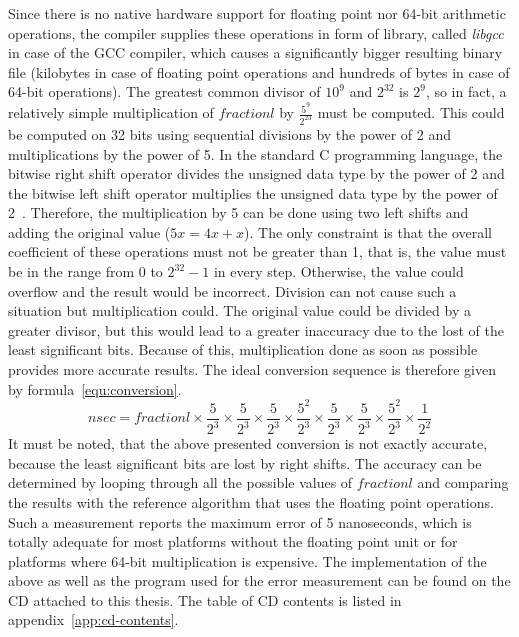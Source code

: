 Since there is no native hardware support for floating point nor 64-bit arithmetic operations,
the compiler supplies these operations in form of library, called {\it{libgcc}} in case of the GCC compiler,
which causes a significantly bigger resulting binary file
(kilobytes in case of floating point operations and hundreds of bytes in case of 64-bit operations).
The greatest common divisor of $10^9$ and $2^{32}$ is $2^9$,
so in fact, a relatively simple multiplication of $fractionl$ by $\frac{5^9}{2^{23}}$ must be computed.
This could be computed on 32 bits using sequential
divisions by the power of 2 and multiplications by the power of 5.
In the standard C programming language, the bitwise right shift operator divides the unsigned data type by the power of 2
and the bitwise left shift operator multiplies the unsigned data type by the power of 2~\cite{c99}.
Therefore, the multiplication by 5 can be done using two left shifts and
adding the original value ($5x = 4x + x$).
The only constraint is that the overall coefficient of these operations must not be greater than 1,
that is, the value must be in the range from $0$ to $2^{32}-1$ in every step.
Otherwise, the value could overflow and the result would be incorrect.
Division can not cause such a situation but multiplication could.
The original value could be divided by a greater divisor,
but this would lead to a greater inaccuracy due to the lost of the least significant bits.
Because of this, multiplication done as soon as possible provides more accurate results.
The ideal conversion sequence is therefore given by formula~\ref{equ:conversion}.
\begin{equation}
\label{equ:conversion}
nsec = fractionl \times \frac{5}{2^3} \times \frac{5}{2^3} \times \frac{5}{2^3} \times \frac{5^2}{2^3} \times \frac{5}{2^3}  \times \frac{5}{2^3} \times \frac{5^2}{2^3} \times \frac{1}{2^2}
\end{equation}
It must be noted, that the above presented conversion is not exactly accurate,
because the least significant bits are lost by right shifts. %
The accuracy can be determined by looping through all the possible values of $fractionl$ %
and comparing the results with the reference algorithm that uses the floating point operations.
Such a measurement reports the maximum error of 5 nanoseconds,
which is totally adequate for most platforms without the floating point unit or
for platforms where 64-bit multiplication is expensive.
The implementation of the above as well as the program used for the
error measurement can be found on the CD attached to this thesis.
The table of CD contents is listed in appendix~\ref{app:cd-contents}.


